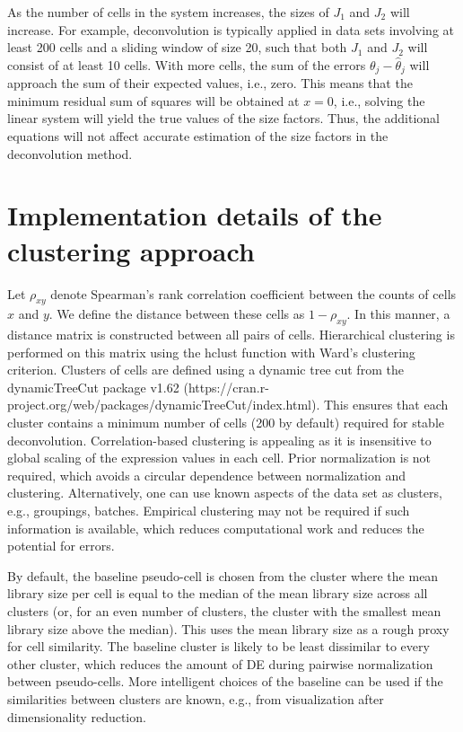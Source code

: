 \documentclass{article}
\begin{document}
As the number of cells in the system increases, the sizes of $J_1$ and $J_2$ will increase. 
For example, deconvolution is typically applied in data sets involving at least 200 cells and a sliding window of size 20, such that both $J_1$ and $J_2$ will consist of at least 10 cells.
With more cells, the sum of the errors $\theta_j - \hat\theta_j$ will approach the sum of their expected values, i.e., zero.
This means that the minimum residual sum of squares will be obtained at $x=0$, i.e., solving the linear system will yield the true values of the size factors.
Thus, the additional equations will not affect accurate estimation of the size factors in the deconvolution method.

\section{Implementation details of the clustering approach}
Let $\rho_{xy}$ denote Spearman's rank correlation coefficient between the counts of cells $x$ and $y$.
We define the distance between these cells as $1-\rho_{xy}$.
In this manner, a distance matrix is constructed between all pairs of cells.
Hierarchical clustering is performed on this matrix using the hclust function with Ward's clustering criterion.
Clusters of cells are defined using a dynamic tree cut from the dynamicTreeCut package v1.62 ({https://cran.r-project.org/web/packages/dynamicTreeCut/index.html}).
This ensures that each cluster contains a minimum number of cells (200 by default) required for stable deconvolution.
Correlation-based clustering is appealing as it is insensitive to global scaling of the expression values in each cell.
Prior normalization is not required, which avoids a circular dependence between normalization and clustering.
Alternatively, one can use known aspects of the data set as clusters, e.g., groupings, batches.
Empirical clustering may not be required if such information is available, which reduces computational work and reduces the potential for errors.


By default, the baseline pseudo-cell is chosen from the cluster where the mean library size per cell is equal to the median of the mean library size across all clusters
    (or, for an even number of clusters, the cluster with the smallest mean library size above the median).
This uses the mean library size as a rough proxy for cell similarity.
The baseline cluster is likely to be least dissimilar to every other cluster, which reduces the amount of DE during pairwise normalization between pseudo-cells.
More intelligent choices of the baseline can be used if the similarities between clusters are known, e.g., from visualization after dimensionality reduction.
\end{document}
